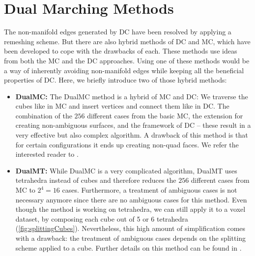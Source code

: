 \section{Dual Marching Methods}
The non-manifold edges generated by \ac{DC} have been resolved by applying a remeshing scheme. But there are also hybrid methods of \ac{DC} and \ac{MC}, which have been developed to cope with the drawbacks of each. These methods use ideas from both the \ac{MC} and the \ac{DC} approaches. Using one of these methods would be a way of inherently avoiding non-manifold edges while keeping all the beneficial properties of \ac{DC}. Here, we briefly introduce two of those hybrid methods:
\begin{itemize}
\item \textbf{\acl{DualMC}:}
The \acf{DualMC} method is a hybrid of \ac{MC} and \ac{DC}: We traverse the cubes like in \ac{MC} and insert vertices and connect them like in \ac{DC}. The combination of the $256$ different cases from the basic \ac{MC}, the extension for creating non-ambiguous surfaces, and the framework of \ac{DC} -- these result in a very effective but also complex algorithm. A drawback of this method is that for certain configurations it ends up creating non-\ac{quad} faces. We refer the interested reader to  \cite{Nielson2004, Zhang2012,ScottSchaefer2004}.

\item \textbf{\acl{DualMT}:}
While \ac{DualMC} is a very complicated algorithm, \acf{DualMT} uses tetrahedra instead of cubes and therefore reduces the $256$ different cases from \ac{MC} to $2^4=16$ cases. Furthermore, a treatment of ambiguous cases is not necessary anymore since there are no ambiguous cases for this method.
Even though the method is working on tetrahedra, we can still apply it to a voxel dataset, by composing each cube out of 5 or 6 tetrahedra (\autoref{fig:splittingCubes}). Nevertheless, this high amount of simplification comes with a drawback: the treatment of ambiguous cases depends on the splitting scheme applied to a cube. Further details on this method can be found in \cite{Nielson2008}.

\end{itemize}

